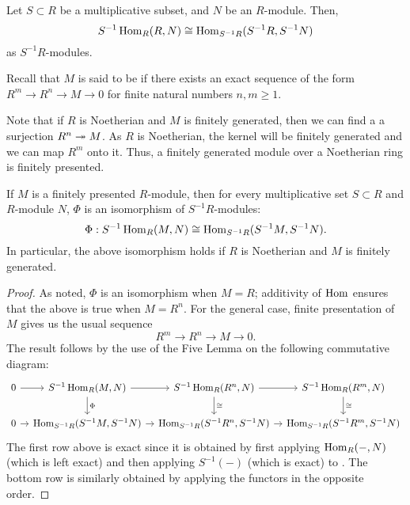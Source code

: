 \begin{prop} \label{prop:Hom-localise-first-coordinate-R}
	Let $S \subset R$ be a multiplicative subset, and $N$ be an $R$-module. Then,
	\begin{equation*} 
		S^{-1}\operatorname{Hom}_{R}(R, N) \cong \operatorname{Hom}_{S^{-1}R}(S^{-1}R, S^{-1}N)
	\end{equation*}
	as $S^{-1}R$-modules.
\end{prop}

Recall that $M$ is said to be  if there exists an exact sequence of the form $R^{m} \to R^{n} \to M \to 0$ for finite natural numbers $n, m \ge 1$. 

Note that if $R$ is Noetherian and $M$ is finitely generated, then we can find a a surjection $R^{n} \twoheadrightarrow M$. As $R$ is Noetherian, the kernel will be finitely generated and we can map $R^{m}$ onto it. Thus, a finitely generated module over a Noetherian ring is finitely presented.

\begin{prop} \label{prop:finitely-presented-Hom-localise}
	If $M$ is a finitely presented $R$-module, then for every multiplicative set $S \subset R$ and $R$-module $N$, $\Phi$ is an isomorphism of $S^{-1}R$-modules:
	\begin{equation*} 
		\Phi : S^{-1}\operatorname{Hom}_{R}(M, N) \cong \operatorname{Hom}_{S^{-1}R}(S^{-1}M, S^{-1}N).
	\end{equation*}
	In particular, the above isomorphism holds if $R$ is Noetherian and $M$ is finitely generated.
\end{prop}

\begin{proof} 
	As noted, $\Phi$ is an isomorphism when $M = R$; additivity of $\operatorname{Hom}$ ensures that the above is true when $M = R^{n}$. For the general case, finite presentation of $M$ gives us the usual sequence 
	\begin{equation*} \label{eq:04}
		R^{m} \to R^{n} \to M \to 0.
	\end{equation*} 
	The result follows by the use of the Five Lemma on the following commutative diagram:
	\begin{equation*} 
		\begin{tikzcd}[column sep=3mm]
			0 \arrow[r] & S^{-1}\Hom_{R}(M, N) \arrow[d, "\Phi"] \arrow[r] & S^{-1}\Hom_{R}(R^{n}, N) \arrow[r] \arrow[d, "\cong"] & S^{-1}\Hom_{R}(R^{m}, N) \arrow[d, "\cong"] \\
			0 \arrow[r] & \Hom_{S^{-1}R}(S^{-1}M, S^{-1}N) \arrow[r] & \Hom_{S^{-1}R}(S^{-1}R^{n}, S^{-1}N) \arrow[r] & \Hom_{S^{-1}R}(S^{-1}R^{m}, S^{-1}N)
		\end{tikzcd}
	\end{equation*}
	The first row above is exact since it is obtained by first applying $\operatorname{Hom}_{R}(-, N)$ (which is left exact) and then applying $S^{-1}(-)$ (which is exact) to . \newline
	The bottom row is similarly obtained by applying the functors in the opposite order.
\end{proof}

